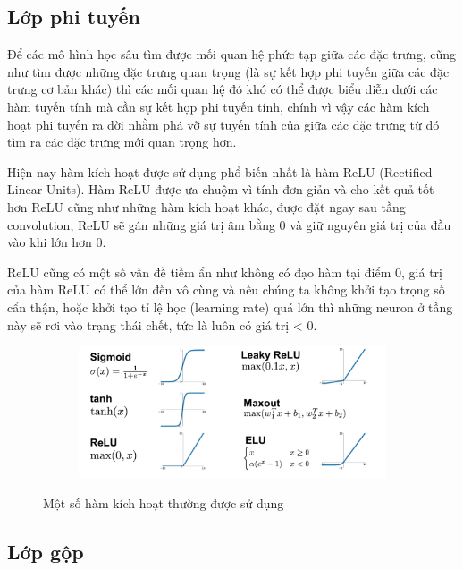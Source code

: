 \subsection{Lớp phi tuyến}

Để các mô hình học sâu tìm được mối quan hệ phức tạp giữa các đặc trưng, cũng như tìm được những đặc trưng quan trọng
(là sự kết hợp phi tuyến giữa các đặc trưng cơ bản khác) thì các mối quan hệ đó khó có thể được biểu diễn dưới các hàm tuyến tính
mà cần sự kết hợp phi tuyến tính, chính vì vậy các hàm kích hoạt phi tuyến ra đời nhằm phá vỡ sự tuyến tính của giữa các đặc trưng từ đó tìm
ra các đặc trưng mới quan trọng hơn.

Hiện nay hàm kích hoạt được sử dụng phổ biến nhất là hàm ReLU (Rectified Linear Units). Hàm ReLU được ưa chuộm vì tính đơn giản và cho kết quả tốt hơn
ReLU cũng như những hàm kích hoạt khác, được đặt ngay sau tầng convolution, ReLU sẽ gán những giá trị âm bằng 0 và giữ nguyên giá trị của đầu vào khi lớn hơn 0.

ReLU cũng có một số vấn đề tiềm ẩn như không có đạo hàm tại điểm 0, giá trị của hàm ReLU có thể lớn đến vô cùng và
nếu chúng ta không khởi tạo trọng số cẩn thận, hoặc khởi tạo tỉ lệ học (learning rate) quá lớn thì những neuron ở tầng này sẽ rơi vào trạng thái chết, tức là luôn có giá trị < 0.

\begin{figure}
    \begin{subfigure}{1.\textwidth}
        \begin{center}
            \includegraphics[width=1.\linewidth]{Chapters/items/chap2_6.jpg}
        \end{center}
        \label{fig: chap2_6}
    \end{subfigure}
    \caption{Một số hàm kích hoạt thường được sử dụng}
\end{figure}

\newpage
\subsection{Lớp gộp}

